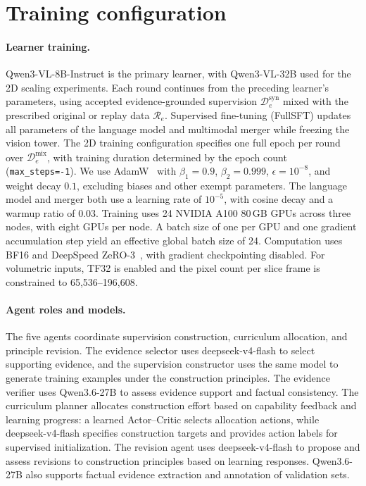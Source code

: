 

\section{Training configuration}
\label{app:implementation}

\paragraph{Learner training.}
Qwen3-VL-8B-Instruct is the primary learner, with Qwen3-VL-32B used for the 2D scaling experiments. Each round continues from the preceding learner's parameters, using accepted evidence-grounded supervision $\mathcal D_e^{\mathrm{syn}}$ mixed with the prescribed original or replay data $\mathcal R_e$. Supervised fine-tuning (FullSFT) updates all parameters of the language model and multimodal merger while freezing the vision tower. The 2D training configuration specifies one full epoch per round over $\mathcal D_e^{\mathrm{mix}}$, with training duration determined by the epoch count (\texttt{max\_steps=-1}). We use AdamW~\citep{loshchilov2019decoupled} with $\beta_1=0.9$, $\beta_2=0.999$, $\epsilon=10^{-8}$, and weight decay $0.1$, excluding biases and other exempt parameters. The language model and merger both use a learning rate of $10^{-5}$, with cosine decay and a warmup ratio of $0.03$. Training uses 24 NVIDIA A100 80\,GB GPUs across three nodes, with eight GPUs per node. A batch size of one per GPU and one gradient accumulation step yield an effective global batch size of 24. Computation uses BF16 and DeepSpeed ZeRO-3~\citep{rajbhandari2020zero}, with gradient checkpointing disabled. For volumetric inputs, TF32 is enabled and the pixel count per slice frame is constrained to 65,536--196,608.
\paragraph{Agent roles and models.}
The five agents coordinate supervision construction, curriculum allocation, and principle revision. The evidence selector uses deepseek-v4-flash to select supporting evidence, and the supervision constructor uses the same model to generate training examples under the construction principles. The evidence verifier uses Qwen3.6-27B to assess evidence support and factual consistency. The curriculum planner allocates construction effort based on capability feedback and learning progress: a learned Actor--Critic selects allocation actions, while deepseek-v4-flash specifies construction targets and provides action labels for supervised initialization. The revision agent uses deepseek-v4-flash to propose and assess revisions to construction principles based on learning responses. Qwen3.6-27B also supports factual evidence extraction and annotation of validation sets.

